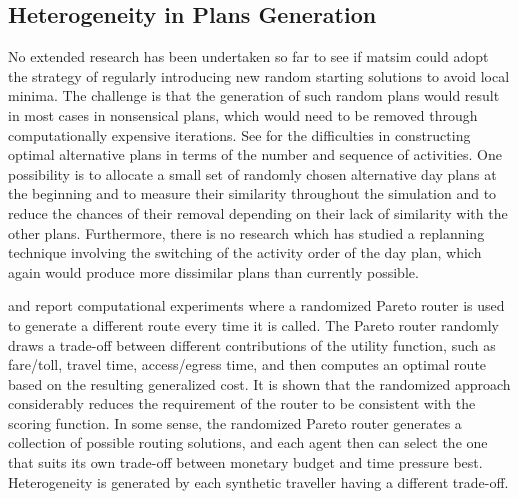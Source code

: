 \subsection{Heterogeneity in Plans Generation}
\label{sec:heterogeneity-in-plans-generation}


No extended research has been undertaken so far to see if \gls{matsim} could adopt the strategy of 
regularly introducing new random 
starting solutions to avoid local minima. 
The challenge is that the generation of such random plans would result in most cases in nonsensical plans, which would need to be removed through computationally expensive iterations. 
See \citet[][]{Feil_PhDThesis_2010} for the difficulties in constructing optimal alternative plans in terms of the number and sequence of activities. 
One possibility is to allocate a small set of randomly chosen alternative day plans at the beginning and to measure their similarity throughout the simulation and to reduce the chances of their removal depending on their lack of similarity with the other plans. %
Furthermore, there is no research which has studied a replanning technique involving the switching of the activity order of the day plan, which again would produce more dissimilar plans than currently possible. 

\cite{MoyoNagelptNetCalibration} and \cite{NagelKickhoeferJoubert2014HeterogeneousVoTsPROCEDIA} report computational experiments where a randomized Pareto router is used to generate a different route every time it is called.  The Pareto router randomly draws a trade-off between different contributions of the utility function, such as fare/toll, travel time, access/egress time, and then computes an optimal route based on the resulting generalized cost.  It is shown that the randomized approach considerably reduces the requirement of the router to be consistent with the scoring function.  In some sense, the randomized Pareto router generates a collection of possible routing solutions, and each agent then can select the one that suits its own trade-off between monetary budget and time pressure best.  Heterogeneity is generated by each synthetic traveller having a different trade-off.

